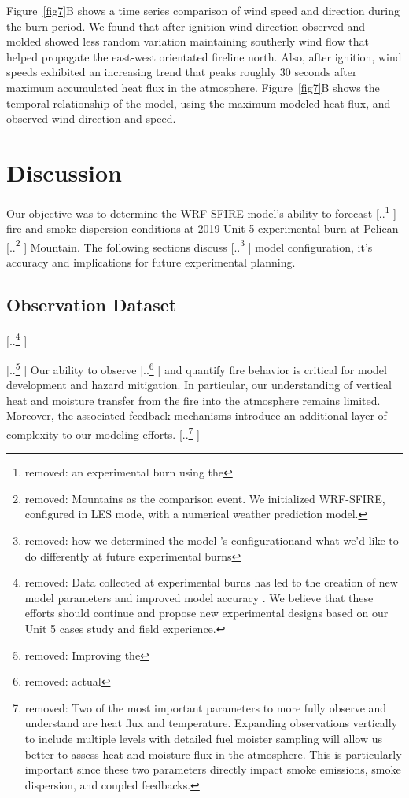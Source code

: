 \documentclass[preprints,article,accept,moreauthors,pdftex]{Definitions/mdpi}
\providecommand{\DIFadd}[1]{{\protect\color{blue} \sf #1}} %
\providecommand{\DIFdel}[1]{{\protect\color{red} [..\footnote{removed: #1} ]}} %
\providecommand{\DIFaddbegin}{} %
\providecommand{\DIFaddend}{} %
\providecommand{\DIFdelbegin}{} %
\providecommand{\DIFdelend}{} %
\begin{document}
Figure~\ref{fig7}B shows a time series comparison of wind speed and direction during the burn period. We found that after ignition wind direction observed and molded showed less random variation maintaining southerly wind flow that helped propagate the east-west orientated fireline north. Also, after ignition, wind speeds exhibited an increasing trend that peaks roughly 30 seconds after maximum accumulated heat flux in the atmosphere. Figure~\ref{fig7}B shows the temporal relationship of the model, using the maximum modeled heat flux, and observed wind direction and speed.

\section{Discussion}

Our objective was to determine the WRF-SFIRE model’s ability to forecast \DIFdelbegin \DIFdel{an experimental burn using the }\DIFdelend \DIFaddbegin \DIFadd{fire and smoke dispersion conditions at }\DIFaddend 2019 Unit 5 \DIFaddbegin \DIFadd{experimental }\DIFaddend burn at Pelican \DIFdelbegin \DIFdel{Mountains as the comparison event. We initialized WRF-SFIRE, configured in LES mode, with a numerical weather prediction model. }\DIFdelend \DIFaddbegin \DIFadd{Mountain. }\DIFaddend The following sections discuss \DIFdelbegin \DIFdel{how we determined the model ’s configurationand what we’d like to do differently at future experimental burns}\DIFdelend \DIFaddbegin \DIFadd{model configuration, it's accuracy and implications for future experimental planning}\DIFaddend .

\subsection{Observation Dataset}

\DIFdelbegin \DIFdel{Data collected at experimental burns has led to the creation of new model parameters and improved model accuracy \cite{kochanski_experimental_2018,mallia_incorporating_2020,moisseeva_capturing_2019,kochanski_evaluation_2013,coen_requirements_2018}. We believe that these efforts should continue and propose new experimental designs based on our Unit 5 cases study and field experience.
}%

\DIFdel{Improving the }\DIFdelend \DIFaddbegin \DIFadd{Our }\DIFaddend ability to observe \DIFdelbegin \DIFdel{actual }\DIFdelend \DIFaddbegin \DIFadd{and quantify }\DIFaddend fire behavior is critical \DIFaddbegin \DIFadd{for model development and hazard mitigation. In particular, our understanding of vertical heat and moisture transfer from the fire into the atmosphere remains limited. Moreover, the associated feedback mechanisms introduce an additional layer of complexity to our modeling efforts}\DIFaddend .
\DIFdelbegin \DIFdel{Two of the most important parameters to more fully observe and understand are heat flux and temperature. Expanding observations vertically to include multiple levels with detailed fuel moister sampling will allow us better to assess heat and moisture flux in the atmosphere. This is particularly important since these two parameters directly impact smoke emissions, smoke dispersion, and coupled feedbacks.
}\DIFdelend
\end{document}
